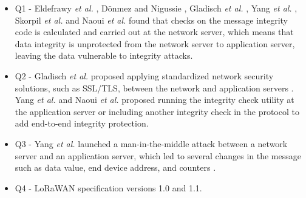 \documentclass[manuscript,screen,review=false]{acmart}
\begin{document}
\begin{itemize}
\item Q1 - Eldefrawy {\it et al.} \cite{01_formal_security_analysis_LoRaWAN}, D\"onmez and Nigussie \cite{03_security_LoRaWANv1.1_scenarios}, Gladisch {\it et al.} \cite{24_securely_IoT_lorawan}, Yang {\it et al.} \cite{37_security_vulnerabilities_lorawan}, Skorpil {\it et al.} \cite{59_IoT_security_overview_practical_demonstration} and Naoui {\it et al.} \cite{98_lorawan_framework_smarthome} found that checks on the message integrity code is calculated and carried out at the network server, which means that data integrity is unprotected from the network server to application server, leaving the data vulnerable to integrity attacks.

\item Q2 - Gladisch {\it et al.} proposed applying standardized network security solutions, such as SSL/TLS, between the network and application servers \cite{24_securely_IoT_lorawan}. Yang {\it et al.} \cite{37_security_vulnerabilities_lorawan} and Naoui {\it et al.} \cite{98_lorawan_framework_smarthome} proposed running the integrity check utility at the application server or including another integrity check in the protocol to add end-to-end integrity protection.

\item Q3 - Yang {\it et al.} launched a man-in-the-middle attack between a network server and an application server, which led to several changes in the message such as data value, end device address, and counters \cite{37_security_vulnerabilities_lorawan}.

\item Q4 - LoRaWAN specification versions 1.0 and 1.1.

\end{itemize}
\end{document}
